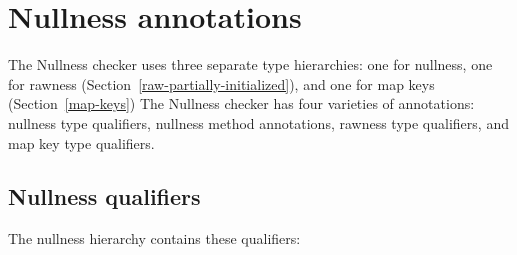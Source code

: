 \section{Nullness annotations\label{nullness-annotations}}

The Nullness checker uses three separate type hierarchies:  one for nullness,
one for rawness (Section~\ref{raw-partially-initialized}),
and one for map keys (Section~\ref{map-keys})
The Nullness checker has four varieties of annotations:  nullness
type qualifiers, nullness method annotations, rawness type qualifiers, and
map key type
qualifiers.

\subsection{Nullness qualifiers\label{nullness-qualifiers}}

The nullness hierarchy contains these qualifiers:

